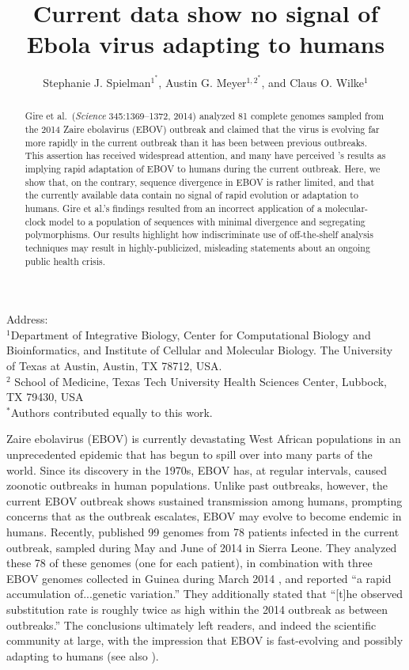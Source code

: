 \documentclass[11pt]{article}
\title{Current data show no signal of Ebola virus adapting to humans}
\author{Stephanie J. Spielman$^{1^\ast}$, Austin G. Meyer$^{1,2^\ast}$, and Claus O. Wilke$^{1}$}
\begin{document}
\maketitle
\maketitle
\noindent
Address:\\
$^1$Department of Integrative Biology, Center for Computational Biology and Bioinformatics, and Institute of Cellular and Molecular Biology.
The University of Texas at Austin, Austin, TX 78712, USA.\\
$^2$ School of Medicine, Texas Tech University Health Sciences Center, Lubbock, TX 79430, USA \\
$^\ast$Authors contributed equally to this work.


\begin{abstract}
{\color{blue}Gire et al.\ (\emph{Science} 345:1369--1372, 2014) analyzed 81 complete genomes sampled from the 2014 Zaire ebolavirus (EBOV) outbreak and claimed that the virus is evolving far more rapidly in the current outbreak than it has been between previous outbreaks. This assertion has received widespread attention, and many have perceived \citet{Gire2014}'s results as implying rapid adaptation of EBOV to humans during the current outbreak. Here, we show that, on the contrary, sequence divergence in EBOV is rather limited, and that the currently available data contain no signal of rapid evolution or adaptation to humans. Gire et al.'s findings resulted from an incorrect application of a molecular-clock model to a population of sequences with minimal divergence and segregating polymorphisms. Our results highlight how indiscriminate use of off-the-shelf analysis techniques may result in highly-publicized, misleading statements about an ongoing public health crisis.}
\end{abstract}

\noindent
Zaire ebolavirus (EBOV) is currently devastating West African populations in an unprecedented epidemic that has begun to spill over into many parts of the world. Since its discovery in the 1970s, EBOV has, at regular intervals, caused zoonotic outbreaks in human populations. Unlike past outbreaks, however, the current EBOV outbreak shows sustained transmission among humans, prompting concerns that as the outbreak escalates, EBOV may evolve to become endemic in humans. Recently, \citet{Gire2014} published 99 genomes from 78 patients infected in the current outbreak, sampled during May and June of 2014 in Sierra Leone. They analyzed these 78 of these genomes (one for each patient), in combination with three EBOV genomes collected in Guinea during March 2014 \citep{Baizeetal2014}, and reported ``a rapid accumulation of...genetic variation.'' They additionally stated that ``[t]he observed substitution rate is roughly twice as high within the 2014 outbreak as between outbreaks.'' The conclusions ultimately left readers, and indeed the scientific community at large, with the impression that EBOV is fast-evolving and possibly adapting to humans (see also \citealt{NatureEditorial,Lukszaetal2014,Alexanderetal2014}). 
\end{document}
